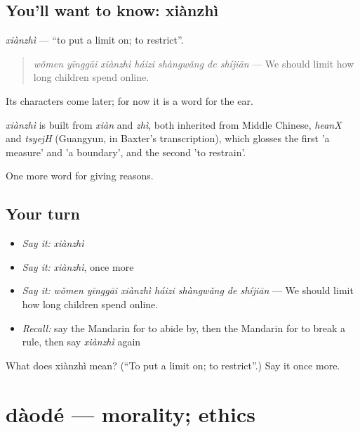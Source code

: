 \subsection*{You'll want to know: xiànzhì}
\emph{xiànzhì} — \textquotedblleft{}to put a limit on; to restrict\textquotedblright{}.

\begin{quote}
\emph{wǒmen yīnggāi xiànzhì háizi shàngwǎng de shíjiān} — We should limit how long children spend online.
\end{quote}

Its characters come later; for now it is a word for the ear.

\begin{cousinweb}
\emph{xiànzhì} is built from \emph{xiàn} and \emph{zhì}, both inherited from Middle Chinese, \emph{heanX} and \emph{tsyejH} (Guangyun, in Baxter's transcription), which glosses the first 'a measure' and 'a boundary', and the second 'to restrain'.
\end{cousinweb}

\begin{grammarlens}[title={What you've built}]
One more word for giving reasons.
\end{grammarlens}

\subsection*{Your turn}
\begin{itemize}
\raggedright
  \item \emph{Say it:} \emph{xiànzhì}
  \item \emph{Say it:} \emph{xiànzhì}, once more
  \item \emph{Say it:} \emph{wǒmen yīnggāi xiànzhì háizi shàngwǎng de shíjiān} — We should limit how long children spend online.
  \item \emph{Recall:} say the Mandarin for to abide by, then the Mandarin for to break a rule, then say \emph{xiànzhì} again
\end{itemize}

\begin{tcolorbox}[breakable,colback=teal!4,colframe=teal!35!black,title={Before you move on}]
What does xiànzhì mean? (\textquotedblleft{}To put a limit on; to restrict\textquotedblright{}.) Say it once more.
\end{tcolorbox}
\section[dàodé]{dàodé — morality; ethics}

